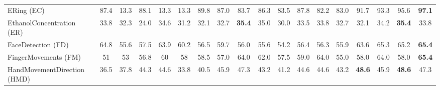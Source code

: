 \documentclass[journal]{IEEEtran}
\begin{document}
\begin{table*}[!t]
\begin{tabular}{l|c|c|c|c|c|cccc|cccc|cccc|}
ERing (EC) & 87.4  & 13.3  & 88.1  & 13.3  & 13.3  & \textcolor[rgb]{ 1,  0,  0}{89.8} & 87.0  & 83.7  & 86.3  & \textcolor[rgb]{ 1,  0,  0}{83.5} & \textcolor[rgb]{ .776,  .349,  .067}{87.8} & 82.2  & 83.0  & \textcolor[rgb]{ 1,  0,  0}{91.7} & \textcolor[rgb]{ .439,  .678,  .278}{93.3} & \textcolor[rgb]{ .439,  .678,  .278}{95.6} & \textcolor[rgb]{ .439,  .678,  .278}{\textbf{97.1}} \\
EthanolConcentration (ER) & 33.8  & 32.3  & 24.0  & 34.6  & 31.2  & \textcolor[rgb]{ 1,  0,  0}{32.1} & \textcolor[rgb]{ .188,  .329,  .588}{32.7} & \textcolor[rgb]{ .188,  .329,  .588}{\textbf{35.4}} & \textcolor[rgb]{ .188,  .329,  .588}{35.0} & \textcolor[rgb]{ 1,  0,  0}{30.0} & \textcolor[rgb]{ .776,  .349,  .067}{33.5} & \textcolor[rgb]{ .776,  .349,  .067}{33.8} & \textcolor[rgb]{ .776,  .349,  .067}{32.7} & \textcolor[rgb]{ 1,  0,  0}{32.1} & \textcolor[rgb]{ .439,  .678,  .278}{34.2} & \textcolor[rgb]{ .439,  .678,  .278}{\textbf{35.4}} & \textcolor[rgb]{ .439,  .678,  .278}{33.8} \\
FaceDetection (FD) & 64.8  & 55.6  & 57.5  & 63.9  & 60.2  & \textcolor[rgb]{ 1,  0,  0}{56.5} & \textcolor[rgb]{ .188,  .329,  .588}{59.7} & 56.0  & 55.6  & \textcolor[rgb]{ 1,  0,  0}{54.2} & \textcolor[rgb]{ .776,  .349,  .067}{56.4} & \textcolor[rgb]{ .776,  .349,  .067}{56.3} & \textcolor[rgb]{ .776,  .349,  .067}{55.9} & \textcolor[rgb]{ 1,  0,  0}{63.6} & \textcolor[rgb]{ .439,  .678,  .278}{65.3} & \textcolor[rgb]{ .439,  .678,  .278}{65.2} & \textcolor[rgb]{ .439,  .678,  .278}{\textbf{65.4}} \\
FingerMovements (FM) & 51    & 53    & 56.8  & 60    & 58    & \textcolor[rgb]{ 1,  0,  0}{58.5} & 57.0  & \textcolor[rgb]{ .188,  .329,  .588}{64.0} & \textcolor[rgb]{ .188,  .329,  .588}{62.0} & \textcolor[rgb]{ 1,  0,  0}{57.5} & \textcolor[rgb]{ .776,  .349,  .067}{59.0} & \textcolor[rgb]{ .776,  .349,  .067}{64.0} & 55.0  & \textcolor[rgb]{ 1,  0,  0}{58.0} & \textcolor[rgb]{ .439,  .678,  .278}{64.0} & 58.0  & \textcolor[rgb]{ .439,  .678,  .278}{\textbf{65.4}} \\
HandMovementDirection (HMD) & 36.5  & 37.8  & 44.3  & 44.6  & 33.8  & \textcolor[rgb]{ 1,  0,  0}{40.5} & \textcolor[rgb]{ .188,  .329,  .588}{45.9} & \textcolor[rgb]{ .188,  .329,  .588}{47.3} & \textcolor[rgb]{ .188,  .329,  .588}{43.2} & \textcolor[rgb]{ 1,  0,  0}{41.2} & \textcolor[rgb]{ .776,  .349,  .067}{44.6} & \textcolor[rgb]{ .776,  .349,  .067}{44.6} & \textcolor[rgb]{ .776,  .349,  .067}{43.2} & \textcolor[rgb]{ 1,  0,  0}{\textbf{48.6}} & 45.9  & \textbf{48.6} & 47.3 \\

\end{tabular}
\end{table*}
\end{document}
